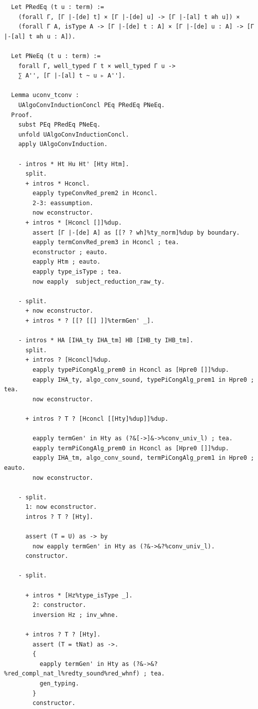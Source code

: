 \documentclass[10pt,a4paper]{amsart}
\begin{document}
\begin{lstlisting}
  Let PRedEq (t u : term) :=
    (forall Γ, [Γ |-[de] t] × [Γ |-[de] u] -> [Γ |-[al] t ≅h u]) ×
    (forall Γ A, isType A -> [Γ |-[de] t : A] × [Γ |-[de] u : A] -> [Γ |-[al] t ≅h u : A]).

  Let PNeEq (t u : term) :=
    forall Γ, well_typed Γ t × well_typed Γ u ->
    ∑ A'', [Γ |-[al] t ~ u ▹ A''].

  Lemma uconv_tconv :
    UAlgoConvInductionConcl PEq PRedEq PNeEq.
  Proof.
    subst PEq PRedEq PNeEq.
    unfold UAlgoConvInductionConcl.
    apply UAlgoConvInduction.
    
    - intros * Ht Hu Ht' [Hty Htm].
      split.
      + intros * Hconcl.
        eapply typeConvRed_prem2 in Hconcl.
        2-3: eassumption.
        now econstructor.
      + intros * [Hconcl []]%dup.
        assert [Γ |-[de] A] as [[? ? wh]%ty_norm]%dup by boundary.
        eapply termConvRed_prem3 in Hconcl ; tea.
        econstructor ; eauto.
        eapply Htm ; eauto.
        eapply type_isType ; tea.
        now eapply  subject_reduction_raw_ty.

    - split.
      + now econstructor.
      + intros * ? [[? [[] ]]%termGen' _].

    - intros * HA [IHA_ty IHA_tm] HB [IHB_ty IHB_tm].
      split.
      + intros ? [Hconcl]%dup.
        eapply typePiCongAlg_prem0 in Hconcl as [Hpre0 []]%dup.
        eapply IHA_ty, algo_conv_sound, typePiCongAlg_prem1 in Hpre0 ; tea.
        now econstructor.

      + intros ? T ? [Hconcl [[Hty]%dup]]%dup.

        eapply termGen' in Hty as (?&[->]&->%conv_univ_l) ; tea.
        eapply termPiCongAlg_prem0 in Hconcl as [Hpre0 []]%dup.
        eapply IHA_tm, algo_conv_sound, termPiCongAlg_prem1 in Hpre0 ; eauto.
        now econstructor.
        
    - split.
      1: now econstructor.
      intros ? T ? [Hty].

      assert (T = U) as -> by
        now eapply termGen' in Hty as (?&->&?%conv_univ_l).
      constructor.

    - split.
      
      + intros * [Hz%type_isType _].
        2: constructor.
        inversion Hz ; inv_whne.

      + intros ? T ? [Hty].
        assert (T = tNat) as ->.
        {
          eapply termGen' in Hty as (?&->&?%red_compl_nat_l%redty_sound%red_whnf) ; tea.
          gen_typing.
        }
        constructor.


\end{lstlisting}
\end{document}
